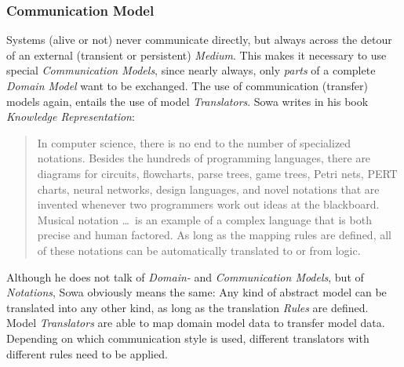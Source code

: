%
%
%
%
%
%
%

\subsubsection{Communication Model}
\label{communication_model_heading}

Systems (alive or not) never communicate directly, but always across the detour
of an external (transient or persistent) \emph{Medium}. This makes it necessary
to use special \emph{Communication Models}, since nearly always, only
\emph{parts} of a complete \emph{Domain Model} want to be exchanged. The use of
communication (transfer) models again, entails the use of model
\emph{Translators}. Sowa \cite{sowa} writes in his book
\emph{Knowledge Representation}:

\begin{quote}
    In computer science, there is no end to the number of specialized notations.
    Besides the hundreds of programming languages, there are diagrams for circuits,
    flowcharts, parse trees, game trees, Petri nets, PERT charts, neural networks,
    design languages, and novel notations that are invented whenever two
    programmers work out ideas at the blackboard. Musical notation \ldots\
    is an example of a complex language that is both precise and human factored.
    As long as the mapping rules are defined, all of these notations can be
    automatically translated to or from logic.
\end{quote}

Although he does not talk of \emph{Domain-} and \emph{Communication Models},
but of \emph{Notations}, Sowa obviously means the same: Any kind of abstract
model can be translated into any other kind, as long as the translation
\emph{Rules} are defined. Model \emph{Translators} are able to map domain model
data to transfer model data. Depending on which communication style is used,
different translators with different rules need to be applied.

